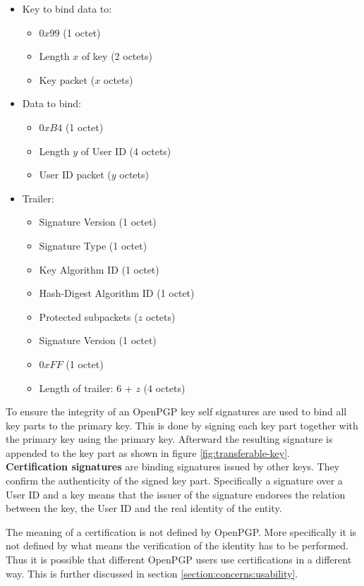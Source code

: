 \begin{itemize} \label{listing:signature}
	\item Key to bind data to:
	\begin{itemize}
		\item $0x99$ (1 octet)
		\item Length $x$ of key (2 octets)
		\item Key packet ($x$ octets)
	\end{itemize}
	
	\item Data to bind:
	\begin{itemize}
		\item $0xB4$ (1 octet)
		\item Length $y$ of User ID (4 octets)
		\item User ID packet ($y$ octets)
	\end{itemize}
	
	\item Trailer:
	\begin{itemize}
		\item Signature Version (1 octet)
		\item Signature Type (1 octet)
		\item Key Algorithm ID (1 octet)
		\item Hash-Digest Algorithm ID (1 octet)
		\item Protected subpackets ($z$ octets)
		\item Signature Version (1 octet) 
		\item $0xFF$ (1 octet)
		\item Length of trailer: 6 + $z$ (4 octets)
	\end{itemize}
\end{itemize}

To ensure the integrity of an OpenPGP key self signatures are used to bind all key parts to the primary key. This is done by signing each key part together with the primary key using the primary key. Afterward the resulting signature is appended to the key part as shown in figure \ref{fig:transferable-key}. \\

\textbf{Certification signatures} are binding signatures issued by other keys. They confirm the authenticity of the signed key part. Specifically a signature over a User ID and a key means that the issuer of the signature endorses the relation between the key, the User ID and the real identity of the entity.

The meaning of a certification is not defined by OpenPGP. More specifically it is not defined by what means the verification of the identity has to be performed. Thus it is possible that different OpenPGP users use certifications in a different way. This is further discussed in section \ref{section:concerns:usability}. \\

